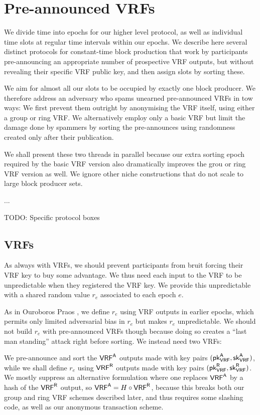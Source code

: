 
\section{Pre-announced VRFs}\label{sec:preannounced}

We divide time into epochs for our higher level protocol, as well as individual time slots at regular time intervals within our epochs.  We describe here several distinct protocols for constant-time block production that work by participants pre-announcing an appropriate number of prospective VRF outputs, but without revealing their specific VRF public key, and then assign slots by sorting these.  

We aim for almost all our slots to be occupied by exactly one block producer.  We therefore address an adversary who spams unearned pre-announced VRFs in tow ways:  We first prevent them outright by anonymising the VRF itself, using either a group or ring VRF.  We alternatively employ only a basic VRF but limit the damage done by spammers by sorting the pre-announces using randomness created only after their publication.

We shall present these two threads in parallel because our extra sorting epoch required by the basic VRF version also dramatically improves the grou or ring VRF version as well.  We ignore other niche constructions that do not scale to large block producer sets. 

...

TODO: Specific protocol boxes


\subsection{VRFs}

As always with VRFs, we should prevent participants from bruit forcing their VRF key to buy some advantage.  We thus need each input to the VRF to be unpredictable when they registered the VRF key.  We provide this unpredictable with a shared random value $r_e$ associated to each epoch $e$.  

As in Ouroboros Praos \cite{Praos}, we define $r_e$ using VRF outputs in earlier epochs, which permits only limited adversarial bias in $r_e$ but makes $r_e$ unpredictable.  We should not build $r_e$ with pre-announced VRFs though because doing so creates a ``last man standing'' attack right before sorting.  We instead need two VRFs:  

We pre-announce and sort the $\mathsf{VRF}^{\mathsf{A}}$ outputs made with key pairs $(\mathsf{pk}_{\mathsf{VRF}}^{\mathsf{A}},\mathsf{sk}_{\mathsf{VRF}}^{\mathsf{A}})$, while we shall define $r_e$ using $\mathsf{VRF}^{\mathsf{R}}$ outputs made with key pairs $(\mathsf{pk}_{\mathsf{VRF}}^{\mathsf{R}},\mathsf{sk}_{\mathsf{VRF}}^{\mathsf{R}})$.  We mostly suppress an alternative formulation where one replaces $\mathsf{VRF}^{\mathsf{A}}$ by a hash of the $\mathsf{VRF}^{\mathsf{R}}$ output, so $\mathsf{VRF}^{\mathsf{A}} = H \circ \mathsf{VRF}^{\mathsf{R}}$, because this breaks both our group and ring VRF schemes described later, and thus requires some slashing code, as well as our anonymous transaction scheme.

